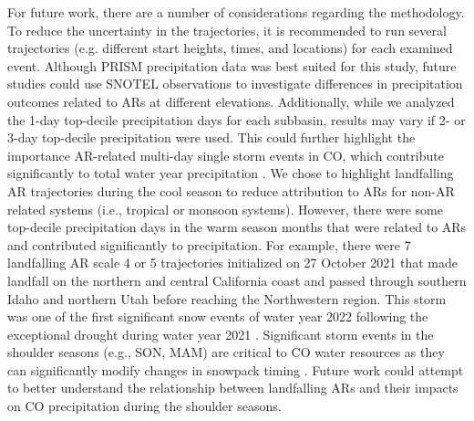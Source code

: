 \documentclass[draft]{agujournal2019}
\begin{document}
For future work, there are a number of considerations regarding the methodology. To reduce the uncertainty in the trajectories, it is recommended to run several trajectories (e.g. different start heights, times, and locations) for each examined event. Although PRISM precipitation data was best suited for this study, future studies could use SNOTEL observations to investigate differences in precipitation outcomes related to ARs at different elevations. Additionally, while we analyzed the 1-day top-decile precipitation days for each subbasin, results may vary if 2- or 3-day top-decile precipitation were used. This could further highlight the importance AR-related multi-day single storm events in CO, which contribute significantly to total water year precipitation \cite{Cowie1986ColoradoAnalysis, Kirk2018LargeBasin, Lute2014RoleStates, Mahoney2015ClimatologyVariability, Serreze2001CharacteristicsData}. We chose to highlight landfalling AR trajectories during the cool season to reduce attribution to ARs for non-AR related systems (i.e., tropical or monsoon systems). However, there were some top-decile precipitation days in the warm season months that were related to ARs and contributed significantly to precipitation. For example, there were 7 landfalling AR scale 4 or 5 trajectories initialized on 27 October 2021 that made landfall on the northern and central California coast and passed through southern Idaho and northern Utah before reaching the Northwestern region. This storm was one of the first significant snow events of water year 2022 following the exceptional drought during water year 2021 \cite{Bolinger2024ClimateEdition}. Significant storm events in the shoulder seasons (e.g., SON, MAM) are critical to CO water resources as they can significantly modify changes in snowpack timing \cite{Heldmyer2023ABasin}. Future work could attempt to better understand the relationship between landfalling ARs and their impacts on CO precipitation during the shoulder seasons.


\end{document}
